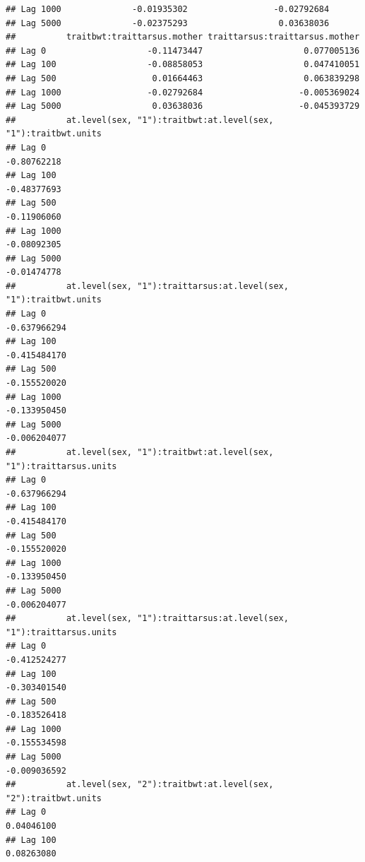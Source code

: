 \documentclass[
  12pt,
]{book}
\begin{document}
\begin{verbatim}
## Lag 1000              -0.01935302                 -0.02792684
## Lag 5000              -0.02375293                  0.03638036
##          traitbwt:traittarsus.mother traittarsus:traittarsus.mother
## Lag 0                    -0.11473447                    0.077005136
## Lag 100                  -0.08858053                    0.047410051
## Lag 500                   0.01664463                    0.063839298
## Lag 1000                 -0.02792684                   -0.005369024
## Lag 5000                  0.03638036                   -0.045393729
##          at.level(sex, "1"):traitbwt:at.level(sex, "1"):traitbwt.units
## Lag 0                                                      -0.80762218
## Lag 100                                                    -0.48377693
## Lag 500                                                    -0.11906060
## Lag 1000                                                   -0.08092305
## Lag 5000                                                   -0.01474778
##          at.level(sex, "1"):traittarsus:at.level(sex, "1"):traitbwt.units
## Lag 0                                                        -0.637966294
## Lag 100                                                      -0.415484170
## Lag 500                                                      -0.155520020
## Lag 1000                                                     -0.133950450
## Lag 5000                                                     -0.006204077
##          at.level(sex, "1"):traitbwt:at.level(sex, "1"):traittarsus.units
## Lag 0                                                        -0.637966294
## Lag 100                                                      -0.415484170
## Lag 500                                                      -0.155520020
## Lag 1000                                                     -0.133950450
## Lag 5000                                                     -0.006204077
##          at.level(sex, "1"):traittarsus:at.level(sex, "1"):traittarsus.units
## Lag 0                                                           -0.412524277
## Lag 100                                                         -0.303401540
## Lag 500                                                         -0.183526418
## Lag 1000                                                        -0.155534598
## Lag 5000                                                        -0.009036592
##          at.level(sex, "2"):traitbwt:at.level(sex, "2"):traitbwt.units
## Lag 0                                                       0.04046100
## Lag 100                                                     0.08263080

\end{verbatim}
\end{document}
